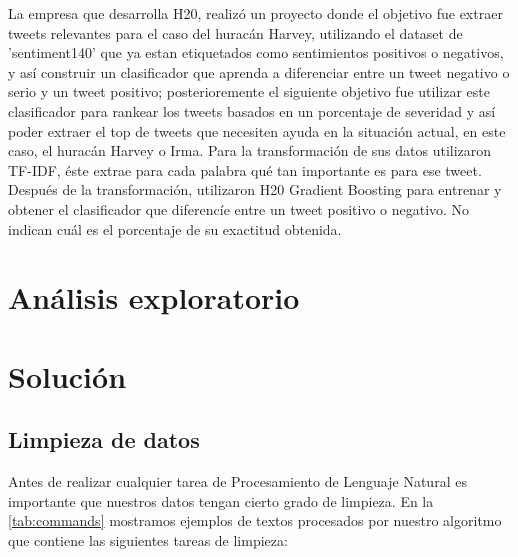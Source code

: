 \documentclass[sigconf, nonacm, spanish]{acmart}
\begin{document}
La empresa que desarrolla H20\cite{H20}, realizó un proyecto donde el objetivo fue extraer tweets relevantes para el caso del huracán Harvey, utilizando el dataset de 'sentiment140' que ya estan etiquetados como sentimientos positivos o negativos, y así construir un clasificador que aprenda a diferenciar entre un tweet negativo o serio y un tweet positivo; posterioremente el siguiente objetivo fue utilizar este clasificador para rankear los tweets basados en un porcentaje de severidad y así poder extraer el top de tweets que necesiten ayuda en la situación actual, en este caso, el huracán Harvey o Irma. Para la transformación de sus datos utilizaron TF-IDF, éste extrae para cada palabra qué tan importante es para ese tweet. Después de la transformación, utilizaron H20 Gradient Boosting para entrenar y obtener el clasificador que diferencíe entre un tweet positivo o negativo. No indican cuál es el porcentaje de su exactitud obtenida.

\section{Análisis exploratorio}



\section{Solución}

\subsection{Limpieza de datos}
Antes de realizar cualquier tarea de Procesamiento de Lenguaje Natural es importante que nuestros datos tengan cierto grado de limpieza. En la \autoref{tab:commands} mostramos ejemplos de textos procesados por nuestro algoritmo que contiene las siguientes tareas de limpieza:
\end{document}
